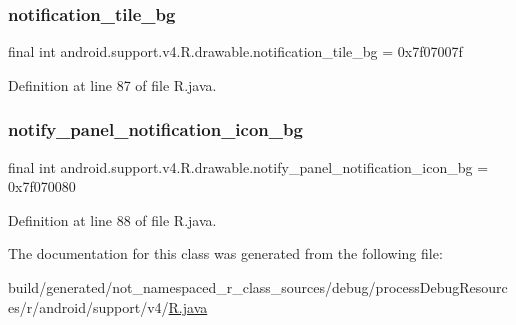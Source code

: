 \subsubsection{\texorpdfstring{notification\_tile\_bg}{notification\_tile\_bg}}
{\footnotesize\ttfamily final int android.\+support.\+v4.\+R.\+drawable.\+notification\+\_\+tile\+\_\+bg = 0x7f07007f\hspace{0.3cm}{\ttfamily [static]}}



Definition at line 87 of file R.\+java.

\mbox{\label{classandroid_1_1support_1_1v4_1_1_r_1_1drawable_a6ec51c56e3b56f429d97dde6d2b6ebaa}} 
\subsubsection{\texorpdfstring{notify\_panel\_notification\_icon\_bg}{notify\_panel\_notification\_icon\_bg}}
{\footnotesize\ttfamily final int android.\+support.\+v4.\+R.\+drawable.\+notify\+\_\+panel\+\_\+notification\+\_\+icon\+\_\+bg = 0x7f070080\hspace{0.3cm}{\ttfamily [static]}}



Definition at line 88 of file R.\+java.



The documentation for this class was generated from the following file\+:\begin{DoxyCompactItemize}
\item 
build/generated/not\+\_\+namespaced\+\_\+r\+\_\+class\+\_\+sources/debug/process\+Debug\+Resources/r/android/support/v4/\mbox{\hyperlink{android_2support_2v4_2_r_8java}{R.\+java}}\end{DoxyCompactItemize}
